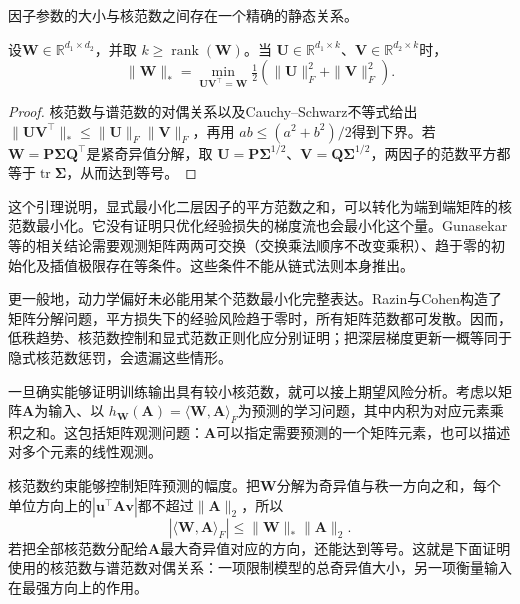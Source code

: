 因子参数的大小与核范数之间存在一个精确的静态关系。
\begin{lemma}[二层分解的范数关系]
\label{lem:factorization-nuclear-norm}
设$\bm W\in\mathbb R^{d_1\times d_2}$，并取
$k\geq\operatorname{rank}(\bm W)$。当
$\bm U\in\mathbb R^{d_1\times k}$、$\bm V\in\mathbb R^{d_2\times k}$时，
\[
 \|\bm W\|_*=\min_{\bm U\bm V^\top=\bm W}
       \tfrac12(\|\bm U\|_F^2+\|\bm V\|_F^2).
\]
\end{lemma}
\begin{proof}
核范数与谱范数的对偶关系以及Cauchy--Schwarz不等式给出
$\|\bm U\bm V^\top\|_*\leq\|\bm U\|_F\|\bm V\|_F$，再用
$ab\leq(a^2+b^2)/2$得到下界。若$\bm W=\bm P\bm\Sigma\bm Q^\top$是紧奇异值分解，取
$\bm U=\bm P\bm\Sigma^{1/2}$、$\bm V=\bm Q\bm\Sigma^{1/2}$，两因子的范数平方都等于$\operatorname{tr}\bm\Sigma$，从而达到等号。
\end{proof}

这个引理说明，显式最小化二层因子的平方范数之和，可以转化为端到端矩阵的核范数最小化。它没有证明只优化经验损失的梯度流也会最小化这个量。Gunasekar等的相关结论需要观测矩阵两两可交换（交换乘法顺序不改变乘积）、趋于零的初始化及插值极限存在等条件。这些条件不能从链式法则本身推出。

更一般地，动力学偏好未必能用某个范数最小化完整表达。Razin与Cohen构造了矩阵分解问题，平方损失下的经验风险趋于零时，所有矩阵范数都可发散。因而，低秩趋势、核范数控制和显式范数正则化应分别证明；把深层梯度更新一概等同于隐式核范数惩罚，会遗漏这些情形。

一旦确实能够证明训练输出具有较小核范数，就可以接上期望风险分析。考虑以矩阵$\bm A$为输入、以
$h_{\bm W}(\bm A)=\langle\bm W,\bm A\rangle_F$为预测的学习问题，其中内积为对应元素乘积之和。这包括矩阵观测问题：$\bm A$可以指定需要预测的一个矩阵元素，也可以描述对多个元素的线性观测。

核范数约束能够控制矩阵预测的幅度。把$\bm W$分解为奇异值与秩一方向之和，每个单位方向上的$|\bm u^\top\bm A\bm v|$都不超过$\|\bm A\|_2$，所以
\[
 |\langle\bm W,\bm A\rangle_F|\leq\|\bm W\|_*\|\bm A\|_2.
\]
若把全部核范数分配给$\bm A$最大奇异值对应的方向，还能达到等号。这就是下面证明使用的核范数与谱范数对偶关系：一项限制模型的总奇异值大小，另一项衡量输入在最强方向上的作用。

